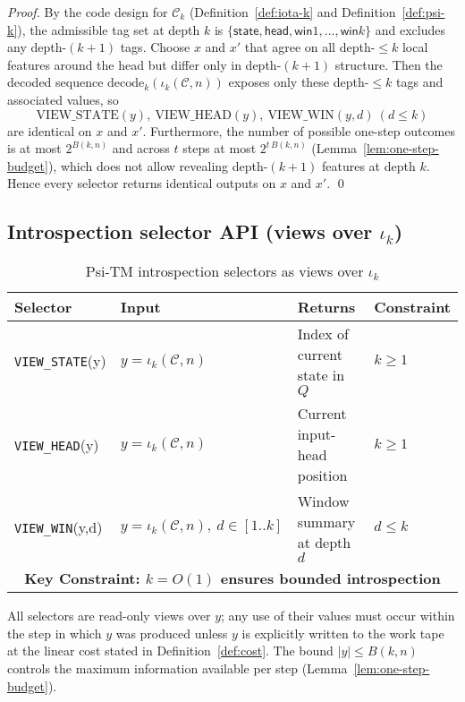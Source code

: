 \documentclass[11pt]{article}
\theoremstyle{definition}
\begin{document}
\begin{proof}
By the code design for $\mathcal{C}_k$ (Definition~\ref{def:iota-k} and Definition~\ref{def:psi-k}), the admissible tag set at depth $k$ is $\{\textsf{state},\textsf{head},\textsf{win}1,\ldots,\textsf{win}k\}$ and excludes any depth-$(k{+}1)$ tags. Choose $x$ and $x'$ that agree on all depth-$\le k$ local features around the head but differ only in depth-$(k{+}1)$ structure. Then the decoded sequence $\mathrm{decode}_k(\iota_k(\mathcal{C},n))$ exposes only these depth-$\le k$ tags and associated values, so
\[\mathrm{VIEW\_STATE}(y),\ \mathrm{VIEW\_HEAD}(y),\ \mathrm{VIEW\_WIN}(y,d)~(d\le k)\]
are identical on $x$ and $x'$. Furthermore, the number of possible one-step outcomes is at most $2^{B(k,n)}$ and across $t$ steps at most $2^{t\,B(k,n)}$ (Lemma~\ref{lem:one-step-budget}), which does not allow revealing depth-$(k{+}1)$ features at depth $k$. Hence every selector returns identical outputs on $x$ and $x'$. \qed
\end{proof}

\subsection{Introspection selector API (views over $\iota_k$)}

\begin{table}[ht]
\centering
\caption{Psi-TM introspection selectors as views over $\iota_k$}
\label{tab:introspection-api}
\begin{tabular}{|l|l|l|l|}
\hline
\textbf{Selector} & \textbf{Input} & \textbf{Returns} & \textbf{Constraint} \\
\hline
\texttt{VIEW\_STATE}(y) & $y=\iota_k(\mathcal{C},n)$ & Index of current state in $Q$ & $k \ge 1$ \\
\hline
\texttt{VIEW\_HEAD}(y) & $y=\iota_k(\mathcal{C},n)$ & Current input-head position & $k \ge 1$ \\
\hline
\texttt{VIEW\_WIN}(y,d) & $y=\iota_k(\mathcal{C},n),\ d\in[1..k]$ & Window summary at depth $d$ & $d \le k$ \\
\hline
\multicolumn{4}{|c|}{\textbf{Key Constraint: $k = O(1)$ ensures bounded introspection}} \\
\hline
\end{tabular}
\end{table}

All selectors are read-only views over $y$; any use of their values must occur within the step in which $y$ was produced unless $y$ is explicitly written to the work tape at the linear cost stated in Definition~\ref{def:cost}. The bound $|y|\le B(k,n)$ controls the maximum information available per step (Lemma~\ref{lem:one-step-budget}).
\end{document}
